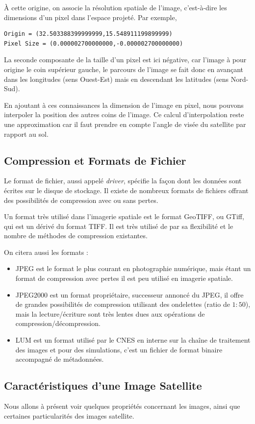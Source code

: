 \documentclass[a4paper, 11pt]{report}
\begin{document}
À cette origine, on associe la résolution spatiale de l'image, c'est-à-dire les dimensions d'un pixel dans l'espace projeté.
Par exemple,
\begin{verbatim}
Origin = (32.503388399999999,15.548911199899999)
Pixel Size = (0.000002700000000,-0.000002700000000)
\end{verbatim}
La seconde composante de la taille d'un pixel est ici négative, car l'image à pour origine le coin supérieur gauche, le parcours de l'image se fait donc en avançant dans les longitudes (sens Ouest-Est) mais en descendant les latitudes (sens Nord-Sud).

En ajoutant à ces connaissances la dimension de l'image en pixel, nous pouvons interpoler la position des autres coins de l'image. Ce calcul d'interpolation reste une approximation car il faut prendre en compte l'angle de visée du satellite par rapport au sol.

\subsection{Compression et Formats de Fichier}
Le format de fichier, aussi appelé \emph{driver}, spécifie la façon dont les données sont écrites sur le disque de stockage.
Il existe de nombreux formats de fichiers offrant des possibilités de compression avec ou sans pertes.

Un format très utilisé dans l'imagerie spatiale est le format GeoTIFF, ou GTiff, qui est un dérivé du format TIFF. Il est très utilisé de par sa flexibilité et le nombre de méthodes de compression existantes.

On citera aussi les formats :
\begin{itemize}
	\item JPEG est le format le plus courant en photographie numérique, mais étant un format de compression avec pertes il est peu utilisé en imagerie spatiale.
	\item JPEG2000 est un format propriétaire, successeur annoncé du JPEG, il offre de grandes possibilités de compression utilisant des ondelettes (ratio de $1:50$), mais la lecture/écriture sont très lentes dues aux opérations de compression/décompression.
	\item LUM est un format utilisé par le CNES en interne sur la chaîne de traitement des images et pour des simulations, c'est un fichier de format binaire accompagné de métadonnées.
\end{itemize}
\subsection{Caractéristiques d'une Image Satellite}
Nous allons à présent voir quelques propriétés concernant les images, ainsi que certaines particularités des images satellite.
\end{document}
